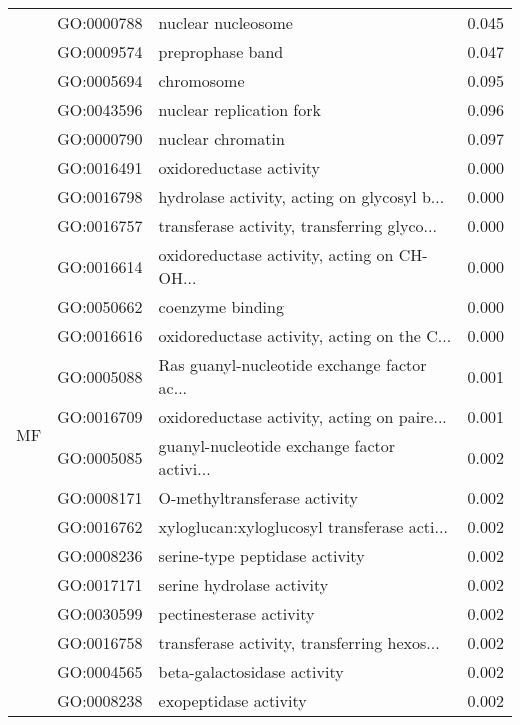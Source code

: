 \begin{longtable}{lllr}
   & GO:0000788 &                           nuclear nucleosome &         0.045 \\
   & GO:0009574 &                             preprophase band &         0.047 \\
   & GO:0005694 &                                   chromosome &         0.095 \\
   & GO:0043596 &                     nuclear replication fork &         0.096 \\
   & GO:0000790 &                            nuclear chromatin &         0.097 \\
\cline{1-4}
\multirow{89}{*}{MF} & GO:0016491 &                      oxidoreductase activity &         0.000 \\
   & GO:0016798 &  hydrolase activity, acting on glycosyl b... &         0.000 \\
   & GO:0016757 &  transferase activity, transferring glyco... &         0.000 \\
   & GO:0016614 &  oxidoreductase activity, acting on CH-OH... &         0.000 \\
   & GO:0050662 &                             coenzyme binding &         0.000 \\
   & GO:0016616 &  oxidoreductase activity, acting on the C... &         0.000 \\
   & GO:0005088 &  Ras guanyl-nucleotide exchange factor ac... &         0.001 \\
   & GO:0016709 &  oxidoreductase activity, acting on paire... &         0.001 \\
   & GO:0005085 &  guanyl-nucleotide exchange factor activi... &         0.002 \\
   & GO:0008171 &                 O-methyltransferase activity &         0.002 \\
   & GO:0016762 &  xyloglucan:xyloglucosyl transferase acti... &         0.002 \\
   & GO:0008236 &               serine-type peptidase activity &         0.002 \\
   & GO:0017171 &                    serine hydrolase activity &         0.002 \\
   & GO:0030599 &                      pectinesterase activity &         0.002 \\
   & GO:0016758 &  transferase activity, transferring hexos... &         0.002 \\
   & GO:0004565 &                  beta-galactosidase activity &         0.002 \\
   & GO:0008238 &                        exopeptidase activity &         0.002 \\

\end{longtable}

